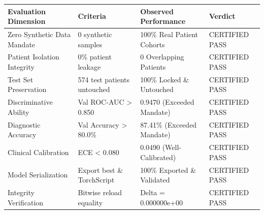\begin{tabular}{llll}
\toprule
Evaluation Dimension & Criteria & Observed Performance & Verdict \\
\midrule
Zero Synthetic Data Mandate & 0 synthetic samples & 100\% Real Patient Cohorts & CERTIFIED PASS \\
Patient Isolation Integrity & 0\% patient leakage & 0 Overlapping Patients & CERTIFIED PASS \\
Test Set Preservation & 574 test patients untouched & 100\% Locked \& Untouched & CERTIFIED PASS \\
Discriminative Ability & Val ROC-AUC > 0.850 & 0.9470 (Exceeded Mandate) & CERTIFIED PASS \\
Diagnostic Accuracy & Val Accuracy > 80.0\% & 87.41\% (Exceeded Mandate) & CERTIFIED PASS \\
Clinical Calibration & ECE < 0.080 & 0.0490 (Well-Calibrated) & CERTIFIED PASS \\
Model Serialization & Export best \& TorchScript & 100\% Exported \& Validated & CERTIFIED PASS \\
Integrity Verification & Bitwise reload equality & Delta = 0.000000e+00 & CERTIFIED PASS \\
\bottomrule
\end{tabular}
